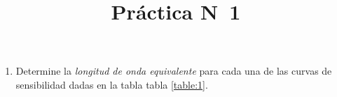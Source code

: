 \documentclass[12pt,spanish,a4paper]{practice}
\begin{document}
    \title{Práctica N\textdegree\ 1}
    \maketitle

    \begin{enumerate}[wide, labelwidth=!, labelindent=0pt, label=\textbf{\arabic*)}, ref=\arabic*]
        \item \label{prob:1} Determine la \emph{longitud de onda equivalente} para cada una de las curvas de sensibilidad dadas en la tabla tabla \ref{table:1}.


\end{enumerate}
\end{document}
